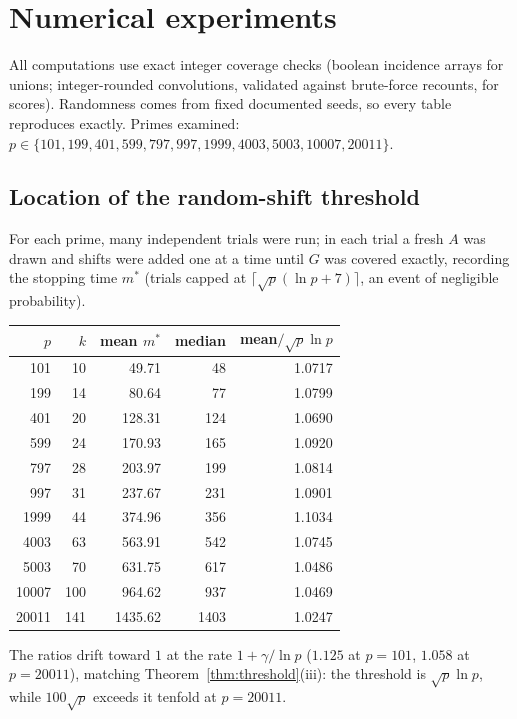 \documentclass[11pt]{article}
\theoremstyle{definition}
\begin{document}
\section{Numerical experiments}\label{sec:numerics}

All computations use exact integer coverage checks (boolean incidence arrays
for unions; integer-rounded convolutions, validated against brute-force
recounts, for scores). Randomness comes from fixed documented seeds, so every
table reproduces exactly. Primes examined:
$p\in\{101,199,401,599,797,997,1999,4003,5003,10007,20011\}$.

\subsection{Location of the random-shift threshold}
For each prime, many independent trials were run; in each trial a fresh $A$
was drawn and shifts were added one at a time until $G$ was covered exactly,
recording the stopping time $m^\ast$ (trials capped at
$\lceil\sqrt p(\ln p+7)\rceil$, an event of negligible probability).

\begin{center}
\begin{tabular}{rrrrr}
\toprule
$p$ & $k$ & mean $m^\ast$ & median & mean$/\sqrt p\ln p$\\
\midrule
101 & 10 & 49.71 & 48 & 1.0717\\
199 & 14 & 80.64 & 77 & 1.0799\\
401 & 20 & 128.31 & 124 & 1.0690\\
599 & 24 & 170.93 & 165 & 1.0920\\
797 & 28 & 203.97 & 199 & 1.0814\\
997 & 31 & 237.67 & 231 & 1.0901\\
1999 & 44 & 374.96 & 356 & 1.1034\\
4003 & 63 & 563.91 & 542 & 1.0745\\
5003 & 70 & 631.75 & 617 & 1.0486\\
10007 & 100 & 964.62 & 937 & 1.0469\\
20011 & 141 & 1435.62 & 1403 & 1.0247\\
\bottomrule
\end{tabular}
\end{center}

The ratios drift toward $1$ at the rate $1+\gamma/\ln p$
($1.125$ at $p=101$, $1.058$ at $p=20011$), matching
Theorem~\ref{thm:threshold}(iii): the threshold is $\sqrt p\ln p$, while
$100\sqrt p$ exceeds it tenfold at $p=20011$.
\end{document}
